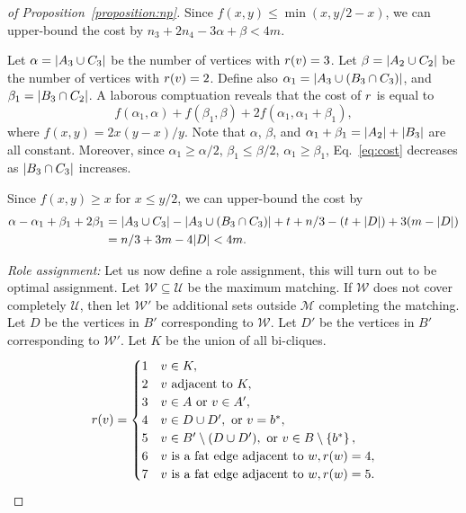 \begin{proof}[of Proposition~\ref{proposition:np}]
Since $f(x, y) \leq \min(x, y / 2 - x)$, we can upper-bound the cost
by $n_3 + 2n_4 - 3\alpha + \beta < 4m$.

\iffalse

Let $\alpha = {\left|A_3 \cup C_3\right|}$ be the number of vertices with $r(v) = 3$.
Let $\beta = {\left|A_2 \cup C_2\right|}$ be the number of vertices with $r(v) = 2$.
Define also $\alpha_1 = {\left|A_3 \cup (B_3 \cap C_3)\right|}$,
and $\beta_1 = {\left|B_3 \cap C_2\right|}$.
A laborous comptuation reveals that the cost of $r$ is equal to
\begin{equation}
\label{eq:cost}
	f(\alpha_1, \alpha) + f(\beta_1, \beta) + 2f(\alpha_1, \alpha_1 + \beta_1),
\end{equation}
where $f(x, y) = 2x(y - x)/y$.
Note that $\alpha$, $\beta$, and $\alpha_1 + \beta_1 = {\left|A_2\right|} + {\left|B_3\right|}$ are all constant.
Moreover, since
$\alpha_1 \geq \alpha / 2$,
$\beta_1 \leq \beta / 2$,
$\alpha_1 \geq \beta_1$, Eq.~\ref{eq:cost} decreases as ${\left|B_3 \cap C_3\right|}$ increases.

Since $f(x, y) \geq x$ for $x \leq y / 2$,
we can upper-bound the cost by
\[
\begin{split}
	\alpha - \alpha_1 + \beta_1 + 2\beta_1 & = {\left|A_3 \cup C_3\right|} - {\left|A_3 \cup (B_3 \cap C_3)\right|} + 
	t + n / 3 - (t + {\left|D\right|}) + 3(m - {\left|D\right|}) \\
	& = n / 3 + 3m - 4{\left|D\right|} < 4m.
\end{split}
\]

\emph{Role assignment:}
Let us now define a role assignment, this will turn out to be optimal
assignment.  Let $\mathcal{W} \subseteq \mathcal{U}$ be the maximum matching.
If $\mathcal{W}$ does not cover completely $\mathcal{U}$, then let $\mathcal{W}'$
be additional sets outside $\mathcal{M}$ completing the matching.
Let $D$ be the vertices in $B'$ corresponding to $\mathcal{W}$.
Let $D'$ be the vertices in $B'$ corresponding to $\mathcal{W}'$.
Let $K$ be the union of all bi-cliques.
\[
	r(v) =
\begin{cases}
1 & v \in K,\\
2 & v \text{ adjacent to } K,\\
3 & v \in A \text{ or } v \in A',\\
4 & v \in D \cup D', \text{ or } v = b^*, \\
5 & v \in B' \setminus (D \cup D'), \text{ or } v \in B \setminus \left\{b^*\right\},\\
6 & v \text{ is a fat edge adjacent to } w, r(w) = 4,\\
7 & v \text{ is a fat edge adjacent to } w, r(w) = 5.\\
\end{cases}
\]


\end{proof}
